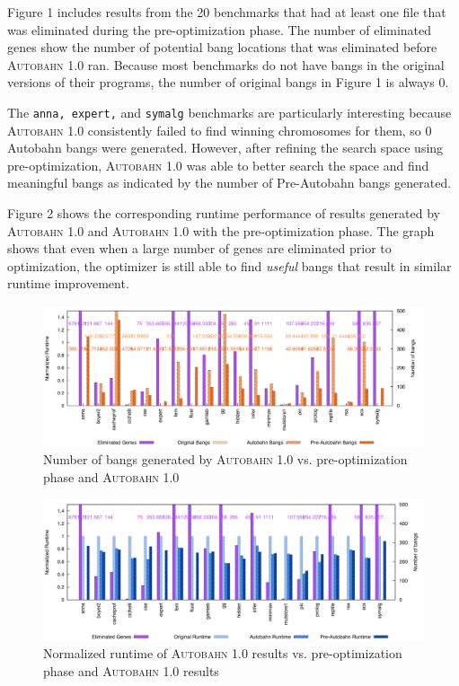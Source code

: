 \documentclass[format=sigplan]{acmart}
\newcommand{\useful}[0]{\textit{useful}}
\newcommand{\Ao}[0]{\textsc{Autobahn 1.0}}
\newcommand{\preopt}[0]{pre-optimization}
\begin{document}
Figure 1 includes results from the 20 benchmarks that had at least one file that was eliminated during the \preopt{} phase. The number of eliminated genes show the number of potential bang locations that was eliminated before \Ao{} ran. Because most benchmarks do not have bangs in the original versions of their programs, the number of original bangs in Figure 1 is always 0. 

The \texttt{anna, expert,} and \texttt{symalg} benchmarks are particularly interesting because \Ao{} consistently failed to find winning chromosomes for them, so 0 Autobahn bangs were generated. However, after refining the search space using \preopt{}, \Ao{} was able to better search the space and find meaningful bangs as indicated by the number of Pre-Autobahn bangs generated. 

Figure 2 shows the corresponding runtime performance of results generated by \Ao{} and \Ao{} with the \preopt{} phase. The graph shows that even when a large number of genes are eliminated prior to optimization, the optimizer is still able to find \useful{} bangs that result in similar runtime improvement.  

\begin{figure}
\includegraphics[width=\textwidth]{preAut1}
\caption{Number of bangs generated by \Ao{} vs. \preopt{} phase and \Ao{}}
\end{figure}

\begin{figure}
\includegraphics[width=\textwidth]{preAut2}
\caption{Normalized runtime of \Ao{} results vs. \preopt{} phase and \Ao{} results}
\end{figure}
\end{document}
